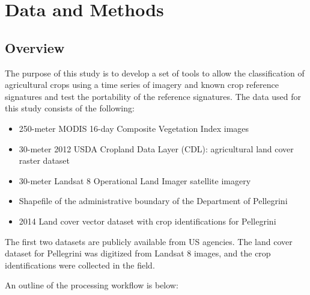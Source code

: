 \chapter{Data and Methods}

\section{Overview}

The purpose of this study is to develop a set of tools to allow the classification of agricultural crops using a time series of imagery and known crop reference signatures and test the portability of the reference signatures. The data used for this study consists of the following:

\begin{Spacing}{1.5}
\begin{itemize}
  \item 250-meter MODIS 16-day Composite Vegetation Index images
  \item 30-meter 2012 USDA Cropland Data Layer (CDL): agricultural land cover raster dataset
  \item 30-meter Landsat 8 Operational Land Imager satellite imagery
  \item Shapefile of the administrative boundary of the Department of Pellegrini 
  \item 2014 Land cover vector dataset with crop identifications for Pellegrini
\end{itemize}
\end{Spacing}

The first two datasets are publicly available from US agencies. The land cover dataset for Pellegrini was digitized from Landsat 8 images, and the crop identifications were collected in the field.

An outline of the processing workflow is below:

